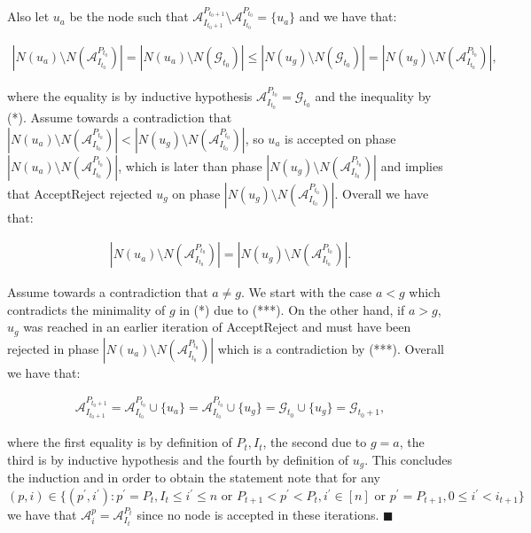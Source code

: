 Also let $u_{a}$ be the node such that $\mathcal{A}^{P_{t_{0}+1}}_{I_{t_{0}+1}}\setminus\mathcal{A}^{P_{t_{0}}}_{I_{t_{0}}}=\{u_{a}\}$ and we have that:\par


\[\begin{gathered}
\displaystyle|N(u_{a})\setminus N(\mathcal{A}^{P_{t_{0}}}_{I_{t_{0}}})|=|N(u_{a})\setminus N(\mathcal{G}_{t_{0}})|\leq|N(u_{g})\setminus N(\mathcal{G}_{t_{0}})|=|N(u_{g})\setminus N(\mathcal{A}^{P_{t_{0}}}_{I_{t_{0}}})|,
\end{gathered}\]


where the equality is by inductive hypothesis $\mathcal{A}^{P_{t_{0}}}_{I_{t_{0}}}=\mathcal{G}_{t_{0}}$ and the inequality by (*).
Assume towards a contradiction that $|N(u_{a})\setminus N(\mathcal{A}^{P_{t_{0}}}_{I_{t_{0}}})|<|N(u_{g})\setminus N(\mathcal{A}^{P_{t_{0}}}_{I_{t_{0}}})|$, so $u_{a}$ is accepted on phase $|N(u_{a})\setminus N(\mathcal{A}^{P_{t_{0}}}_{I_{t_{0}}})|$, which is later than phase $|N(u_{g})\setminus N(\mathcal{A}^{P_{t_{0}}}_{I_{t_{0}}})|$ and implies that AcceptReject rejected $u_{g}$ on phase $|N(u_{g})\setminus N(\mathcal{A}^{P_{t_{0}}}_{I_{t_{0}}})|$.
Overall we have that:\par


\[\begin{gathered}
\displaystyle|N(u_{a})\setminus N(\mathcal{A}^{P_{t_{0}}}_{I_{t_{0}}})|=|N(u_{g})\setminus N(\mathcal{A}^{P_{t_{0}}}_{I_{t_{0}}})|.
\end{gathered}\]


Assume towards a contradiction that $a\neq g$.
We start with the case $a<g$ which contradicts the minimality of $g$ in (*) due to (***).
On the other hand, if $a>g$, $u_{g}$ was reached in an earlier iteration of AcceptReject and must have been rejected in phase $|N(u_{a})\setminus N(\mathcal{A}^{P_{t_{0}}}_{I_{t_{0}}})|$ which is a contradiction by (***).
Overall we have that:\par


\[\begin{gathered}
\displaystyle\mathcal{A}^{P_{t_{0}+1}}_{I_{t_{0}+1}}=\mathcal{A}^{P_{t_{0}}}_{I_{t_{0}}}\cup\{u_{a}\}=\mathcal{A}^{P_{t_{0}}}_{I_{t_{0}}}\cup\{u_{g}\}=\mathcal{G}_{t_{0}}\cup\{u_{g}\}=\mathcal{G}_{t_{0}+1},
\end{gathered}\]


where the first equality is by definition of $P_{t},I_{t}$, the second due to $g=a$, the third is by inductive hypothesis and the fourth by definition of $u_{g}$.
This concludes the induction and in order to obtain the statement note that for any $(p,i)\in\{(p^{\prime},i^{\prime}):p^{\prime}=P_{t},I_{t}\leq i^{\prime}\leq n\text{ or }P_{t+1}<p^{\prime}<P_{t},i^{\prime}\in[n]\text{ or }p^{\prime}=P_{t+1},0\leq i^{\prime}<i_{t+1}\}$ we have that $\mathcal{A}^{p}_{i}=\mathcal{A}^{P_{t}}_{I_{t}}$ since no node is accepted in these iterations.
\ensuremath{\blacksquare}\par





